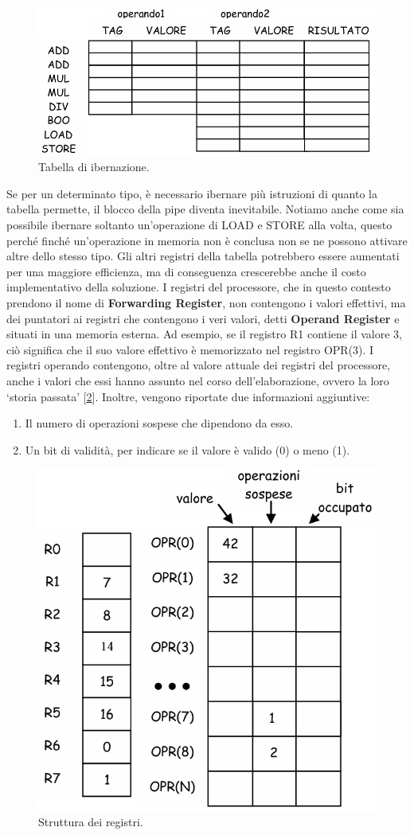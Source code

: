\begin{figure}[!h]
    \centering
    \includegraphics[width=0.5\linewidth]{img/tabella_ibernazione.png}
    \caption{Tabella di ibernazione.}
    \label{fig:tabella_ibern}
\end{figure}
Se per un determinato tipo, è necessario ibernare più istruzioni di quanto la tabella permette, il blocco della pipe diventa inevitabile. Notiamo anche come sia possibile ibernare soltanto un'operazione di LOAD e STORE alla volta, questo perché  finché un'operazione in memoria non è conclusa non se ne possono attivare altre dello stesso tipo. Gli altri registri della tabella potrebbero essere aumentati per una maggiore efficienza, ma di conseguenza crescerebbe anche il costo implementativo della soluzione. I registri del processore, che in questo contesto prendono il nome di \textbf{Forwarding Register}, non contengono i valori effettivi, ma dei puntatori ai registri che contengono i veri valori, detti \textbf{Operand Register} e situati in una memoria esterna. Ad esempio, se il registro R1 contiene il valore 3, ciò significa che il suo valore effettivo è memorizzato nel registro OPR(3). I registri operando contengono, oltre al valore attuale dei registri del processore, anche i valori che essi hanno assunto nel corso dell'elaborazione, ovvero la loro ‘storia passata’ [\ref{fig:for-op-reg}]. Inoltre, vengono riportate due informazioni aggiuntive:
\begin{enumerate}
    \item Il numero di operazioni sospese che dipendono da esso.
    \item Un bit di validità, per indicare se il valore è valido (0) o meno (1). 
\end{enumerate}
\begin{figure}[!h]
    \centering
    \includegraphics[width=0.4\linewidth]{img/registri_if.png}
    \caption{Struttura dei registri.}
    \label{fig:for-op-reg}
\end{figure}
